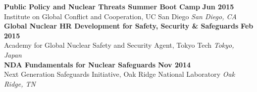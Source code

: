 {\bf Public Policy and Nuclear Threats Summer Boot Camp} \hfill {\bf Jun 2015}\\
{\small{Institute on Global Conflict and Cooperation, UC San Diego}} \hfill {\sl San Diego, CA}\\[-3.5ex]

{\bf Global Nuclear HR Development for Safety, Security \& Safeguards} \hfill {\bf Feb 2015}\\
{\small{Academy for Global Nuclear Safety and Security Agent, Tokyo Tech}}  \hfill {\sl Tokyo, Japan}\\[-3.5ex]

{\bf NDA Fundamentals for Nuclear Safeguards}   \hfill {\bf Nov 2014}\\
{\small{Next Generation Safeguards Initiative, Oak Ridge National Laboratory}} \hfill  {\sl Oak Ridge, TN}

%
